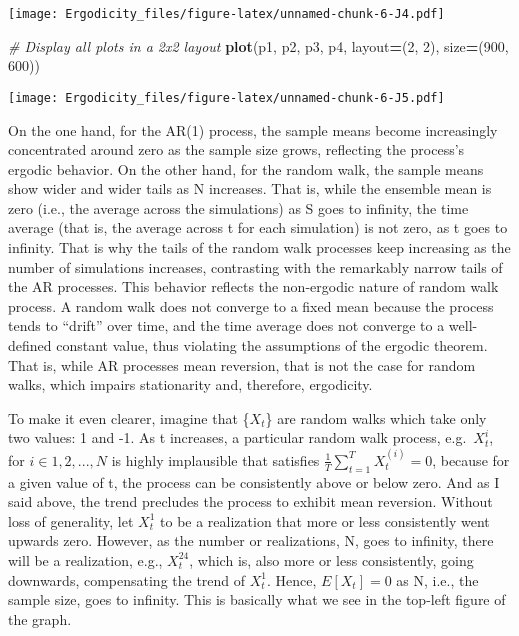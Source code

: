 \documentclass[
]{article}
\newenvironment{Shaded}{\begin{snugshade}}{\end{snugshade}}
\newcommand{\CommentTok}[1]{\textcolor[rgb]{0.56,0.35,0.01}{\textit{#1}}}
\newcommand{\FloatTok}[1]{\textcolor[rgb]{0.00,0.00,0.81}{#1}}
\newcommand{\FunctionTok}[1]{\textcolor[rgb]{0.13,0.29,0.53}{\textbf{#1}}}
\newcommand{\NormalTok}[1]{#1}
\newcommand{\OperatorTok}[1]{\textcolor[rgb]{0.81,0.36,0.00}{\textbf{#1}}}
\begin{document}
\texttt{[image: Ergodicity\_files/figure-latex/unnamed-chunk-6-J4.pdf]}

\begin{Shaded}
\begin{Highlighting}[]

\CommentTok{\# Display all plots in a 2x2 layout}
\FunctionTok{plot}\NormalTok{(p1, p2, p3, p4, layout}\OperatorTok{=}\NormalTok{(}\FloatTok{2}\NormalTok{, }\FloatTok{2}\NormalTok{), size}\OperatorTok{=}\NormalTok{(}\FloatTok{900}\NormalTok{, }\FloatTok{600}\NormalTok{))}
\end{Highlighting}
\end{Shaded}

\texttt{[image: Ergodicity\_files/figure-latex/unnamed-chunk-6-J5.pdf]}

On the one hand, for the AR(1) process, the sample means become
increasingly concentrated around zero as the sample size grows,
reflecting the process's ergodic behavior. On the other hand, for the
random walk, the sample means show wider and wider tails as N increases.
That is, while the ensemble mean is zero (i.e., the average across the
simulations) as S goes to infinity, the time average (that is, the
average across t for each simulation) is not zero, as t goes to
infinity. That is why the tails of the random walk processes keep
increasing as the number of simulations increases, contrasting with the
remarkably narrow tails of the AR processes. This behavior reflects the
non-ergodic nature of random walk process. A random walk does not
converge to a fixed mean because the process tends to ``drift'' over
time, and the time average does not converge to a well-defined constant
value, thus violating the assumptions of the ergodic theorem. That is,
while AR processes mean reversion, that is not the case for random
walks, which impairs stationarity and, therefore, ergodicity.

To make it even clearer, imagine that \{\(X_t\)\} are random walks which
take only two values: 1 and -1. As t increases, a particular random walk
process, e.g.~\(X_t^{i}\), for \(i \in {1, 2, ..., N}\) is highly
implausible that satisfies \(\frac{1}{T} \sum_{t=1}^{T} X_t^{(i)} = 0\),
because for a given value of t, the process can be consistently above or
below zero. And as I said above, the trend precludes the process to
exhibit mean reversion. Without loss of generality, let \(X_t^{1}\) to
be a realization that more or less consistently went upwards zero.
However, as the number or realizations, N, goes to infinity, there will
be a realization, e.g., \(X_t^{24}\), which is, also more or less
consistently, going downwards, compensating the trend of \({X_t^{1}}\).
Hence, \(E[X_t] = 0\) as N, i.e., the sample size, goes to infinity.
This is basically what we see in the top-left figure of the graph.
\end{document}
